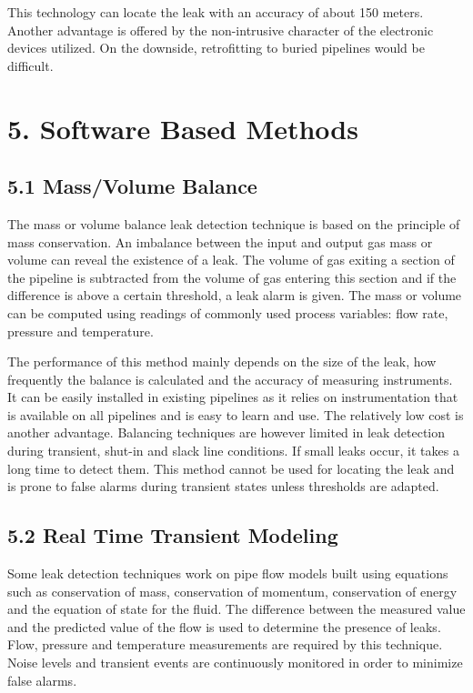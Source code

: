 This technology can locate the leak with an accuracy of about 150 meters. Another advantage is offered by the non-intrusive character of the electronic devices utilized. On the downside, retrofitting to buried pipelines would be difficult.

\section*{5. Software Based Methods}

\subsection*{5.1 Mass/Volume Balance}

The mass or volume balance leak detection technique is based on the principle of mass conservation. An imbalance between the input and output gas mass or volume can reveal the existence of a leak. The volume of gas exiting a section of the pipeline is subtracted from the volume of gas entering this section and if the difference is above a certain threshold, a leak alarm is given. The mass or volume can be computed using readings of commonly used process variables: flow rate, pressure and temperature.

The performance of this method mainly depends on the size of the leak, how frequently the balance is calculated and the accuracy of measuring instruments. It can be easily installed in existing pipelines as it relies on instrumentation that is available on all pipelines and is easy to learn and use. The relatively low cost is another advantage. Balancing techniques are however limited in leak detection during transient, shut-in and slack line conditions. If small leaks occur, it takes a long time to detect them. This method cannot be used for locating the leak and is prone to false alarms during transient states unless thresholds are adapted.

\subsection*{5.2 Real Time Transient Modeling}

Some leak detection techniques work on pipe flow models built using equations such as conservation of mass, conservation of momentum, conservation of energy and the equation of state for the fluid. The difference between the measured value and the predicted value of the flow is used to determine the presence of leaks. Flow, pressure and temperature measurements are required by this technique. Noise levels and transient events are continuously monitored in order to minimize false alarms.

